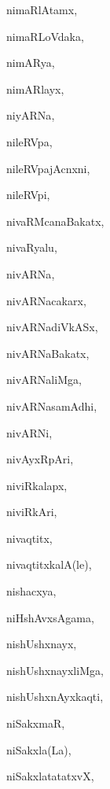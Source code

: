 \begin{multicols}{3}
{\noindent
{nimaRlAtamx}, \pageref{nimaRlAtamx}

\noindent
{nimaRLoVdaka}, \pageref{nimaRLoVdaka}

\noindent
{nimARya}, \pageref{nimARya}

\noindent
{nimARlayx}, \pageref{nimARlayx}

\noindent
{niyARNa}, \pageref{niyARNa}

\noindent
{nileRVpa}, \pageref{nileRVpa}

\noindent
{nileRVpajAcnxni}, \pageref{nileRVpajAcnxni}

\noindent
{nileRVpi}, \pageref{nileRVpi}

\noindent
{nivaRMcanaBakatx}, \pageref{nivaRMcanaBakatx}

\noindent
{nivaRyalu}, \pageref{nivaRyalu}

\noindent
{nivARNa}, \pageref{nivARNa}

\noindent
{nivARNacakarx}, \pageref{nivARNacakarx}

\noindent
{nivARNadiVkASx}, \pageref{nivARNadiVkASx}

\noindent
{nivARNaBakatx}, \pageref{nivARNaBakatx}

\noindent
{nivARNaliMga}, \pageref{nivARNaliMga}

\noindent
{nivARNasamAdhi}, \pageref{nivARNasamAdhi}

\noindent
{nivARNi}, \pageref{nivARNi}

\noindent
{nivAyxRpAri}, \pageref{nivAyxRpAri}

\noindent
{niviRkalapx}, \pageref{niviRkalapx}

\noindent
{niviRkAri}, \pageref{niviRkAri}

\noindent
{nivaqtitx}, \pageref{nivaqtitx}

\noindent
{nivaqtitxkalA(le)}, \pageref{nivaqtitxkalAle}

\noindent
{nishacxya}, \pageref{nishacxya}

\noindent
{niHshAvxsAgama}, \pageref{niHshAvxsAgama}

\noindent
{nishUshxnayx}, \pageref{nishUshxnayx}

\noindent
{nishUshxnayxliMga}, \pageref{nishUshxnayxliMga}

\noindent
{nishUshxnAyxkaqti}, \pageref{nishUshxnAyxkaqti}

\noindent
{niSakxmaR}, \pageref{niSakxmaR}

\noindent
{niSakxla(La)}, \pageref{niSakxlaLa}

\noindent
{niSakxlatatatxvX}, \pageref{niSakxlatatatxvX}

}
\end{multicols}
